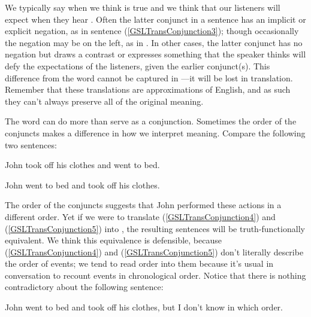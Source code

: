 \noindent{}We typically say  when we think  is true and we think that our listeners will expect \mention{$\THETA$} when they hear \mention{$\PHI$}.  Often the latter conjunct in a  sentence has an implicit or explicit negation, as in sentence (\ref{GSLTransConjunction3}); though occasionally the negation may be on the left, as in .  In other cases, the latter conjunct has no negation but draws a contrast or expresses something that the speaker thinks will defy the expectations of the listeners, given the earlier conjunct(s).  This difference from the word  cannot be captured in \GSL{}---it will be lost in translation.  Remember that these \GSL{} translations are approximations of English, and as such they can't always preserve all of the original meaning.

The word  can do more than serve as a conjunction.  Sometimes the order of the conjuncts makes a difference in how we interpret meaning. Compare the following two sentences:

\begin{menumerate}
	\item\label{GSLTransConjunction4} John took off his clothes and went to bed.
\end{menumerate}
\begin{menumerate}
	\item\label{GSLTransConjunction5} John went to bed and took off his clothes.
\end{menumerate}

The order of the conjuncts suggests that John performed these actions in a different order.  Yet if we were to translate (\ref{GSLTransConjunction4}) and (\ref{GSLTransConjunction5}) into \GSL{}, the resulting sentences will be truth-functionally equivalent.  We think this equivalence is defensible, because (\ref{GSLTransConjunction4}) and (\ref{GSLTransConjunction5}) don't literally describe the order of events; we tend to read order into them because it's usual in conversation to recount events in chronological order.  Notice that there is nothing contradictory about the following sentence:

\begin{menumerate}
	\item John went to bed and took off his clothes, but I don't know in which order.
\end{menumerate}

